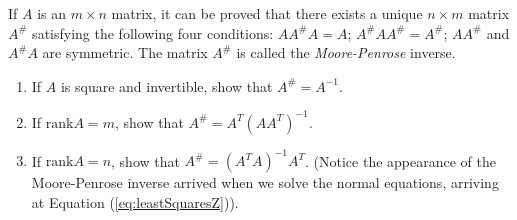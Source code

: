\documentclass{ximera}
\begin{document}
\begin{problem}\label{ex:5_6_14}
If $A$ is an $m \times n$ matrix, it can be proved that there exists a unique $n \times m$ matrix $A^{\#}$ satisfying the following four conditions: $AA^{\#}A = A$; $A^{\#}AA^{\#} = A^{\#}$; $AA^{\#}$ and $A^{\#}A$ are symmetric. The matrix $A^{\#}$ is called the \emph{Moore-Penrose} inverse.

\begin{enumerate}
\item If $A$ is square and invertible, show that $A^{\#} = A^{-1}$.

\item If $\text{rank} A = m$, show that $A^{\#} = A^{T}(AA^{T})^{-1}$.

\item If $\text{rank} A = n$, show that $A^{\#} = (A^{T}A)^{-1}A^{T}$.  (Notice the appearance of the Moore-Penrose inverse arrived when we solve the normal equations, arriving at Equation (\ref{eq:leastSquaresZ})). 

\end{enumerate}
\end{problem}



\end{document}
